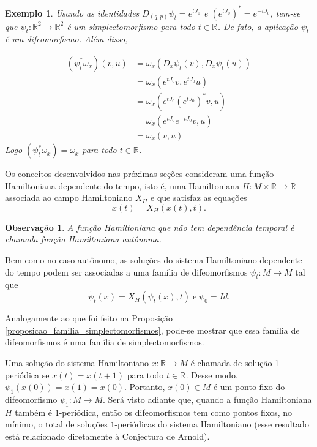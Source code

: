 \documentclass[12pt]{book}
\newtheorem{exemplo}[teorema]{Exemplo}
\newtheorem{observacao}[teorema]{Observação}
\newcommand{\campohamiltoniano}[1]{X_{H}(#1)}
\newcommand{\campohamiltonianoabrev}{X_{H}}
\newcommand{\estruturacomplexa}{J_{0}}
\newcommand{\real}[1]{\mathbb{R}^{#1}}
\newcommand{\reta}{\real{}}
\begin{document}
\begin{exemplo}
		Usando as identidades $D_{(q,p)}\psi_{t} = e^{t\estruturacomplexa}$ e $(e^{t\estruturacomplexa})^{*} = e^{-t\estruturacomplexa}$, tem-se que $\psi_{t}:\real{2}\to \real{2}$ é um simplectomorfismo para todo $t\in \reta$. De fato, a aplicação $\psi_{t}$ é um difeomorfismo. Além disso,
		
		$$
		\begin{aligned}
		(\psi^{*}_{t}\omega_{x})(v,u)
		&=\omega_{x}(D_{x}\psi_{t}(v), D_{x}\psi_{t}(u))
		\\
		&=\omega_{x}(e^{t\estruturacomplexa}v,e^{t\estruturacomplexa}u)
		\\
		&=\omega_{x}(e^{t\estruturacomplexa}(e^{t\estruturacomplexa})^{*}v,u)
		\\
		&=\omega_{x}(e^{t\estruturacomplexa}e^{-t\estruturacomplexa}v,u)
		\\
		&=\omega_{x}(v,u)
		\end{aligned}
		$$
		Logo $	(\psi^{*}_{t}\omega_{x}) = \omega_{x}$ para todo $t\in \reta$.
	\end{exemplo}
	
	Os conceitos desenvolvidos nas próximas seções consideram uma função Hamiltoniana dependente do tempo, isto é, uma Hamiltoniana $H:M\times \reta\to \reta$ associada ao campo Hamiltoniano $\campohamiltonianoabrev$ e que satisfaz as equações
	$$
	\dot{x}(t) = \campohamiltoniano{x(t),t}.
	$$
	
	\begin{observacao}
		A função Hamiltoniana que não tem dependência temporal 	é chamada função Hamiltoniana autônoma.
	\end{observacao}
	
	Bem como no caso autônomo, as soluções do sistema Hamiltoniano dependente do tempo podem ser associadas a uma família de difeomorfismos $\psi_{t}:M \to M$ tal que
	$$
	\dot{\psi_{t}}(x) = \campohamiltoniano{\psi_{t}(x), t}\; \text{e} \; \psi_{0}=Id. 
	$$ 
	
	Analogamente ao que foi feito na Proposição \ref{proposicao_familia_simplectomorfismos}, pode-se mostrar que essa família de difeomorfismos é uma família de simplectomorfismos.
	
	Uma solução do sistema Hamiltoniano $x:\reta\to M$ é chamada de solução 1-periódica se $x(t) = x(t+1)$ para todo $t\in \reta$. Desse modo, $\psi_{1}(x(0)) = x(1) = x(0)$. Portanto, $x(0)\in M$ é um ponto fixo do difeomorfismo $\psi_{1}:M\to M$. Será visto adiante que, quando 
	a função Hamiltoniana $H$ também é $1$-periódica, então os difeomorfismos tem como pontos fixos, no mínimo, o total de soluções $1$-periódicas do sistema Hamiltoniano (esse resultado está relacionado diretamente à Conjectura de Arnold).
	
\end{document}

